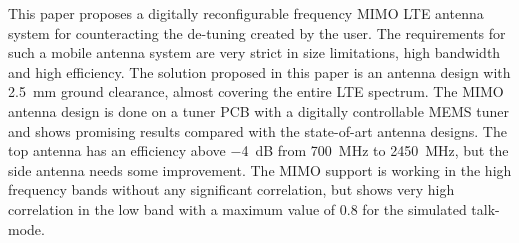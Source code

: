 This paper proposes a digitally reconfigurable frequency MIMO LTE antenna system for counteracting the de-tuning created by the user. The requirements for such a mobile antenna system are very strict in size limitations, high bandwidth and high efficiency. The solution proposed in this paper is an antenna design with \SI{2.5}{mm} ground clearance, almost covering the entire LTE spectrum. 
The MIMO antenna design is done on a tuner PCB with a digitally controllable MEMS tuner and shows promising results compared with the state-of-art antenna designs. The top antenna has an efficiency above \SI{-4}{dB} from \SI{700}{MHz} to \SI{2450}{MHz}, but the side antenna needs some improvement. 
The MIMO support is working in the high frequency bands without any significant correlation, but shows very high correlation in the low band with a maximum value of \num{0.8} for the simulated talk-mode. 

% 
% 
% 
% 
% 
% 
